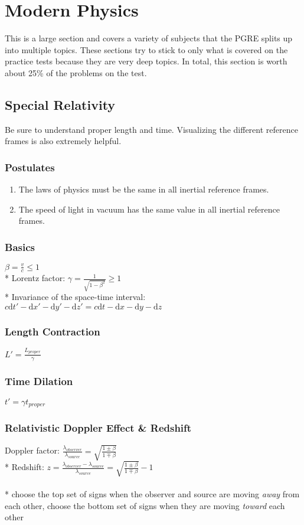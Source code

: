 \section{Modern Physics}
This is a large section and covers a variety of subjects that the PGRE splits up into multiple topics.
These sections try to stick to only what is covered on the practice tests because they are very deep topics.
In total, this section is worth about 25\% of the problems on the test.

\subsection{Special Relativity}
Be sure to understand proper length and time.
Visualizing the different reference frames is also extremely helpful.

\subsubsection{Postulates}
\begin{enumerate}
\item The laws of physics must be the same in all inertial reference frames.
\item The speed of light in vacuum has the same value in all inertial reference frames.
\end{enumerate}

\subsubsection{Basics}
\(\displaystyle\beta=\frac{v}{c}\le1\)\\*
Lorentz factor: \(\displaystyle\gamma=\frac{1}{\sqrt{1-\beta^2}}\ge1\)\\*
Invariance of the space-time interval: \(c\mathrm{d}t'-\mathrm{d}x'-\mathrm{d}y'-\mathrm{d}z'=c\mathrm{d}t-\mathrm{d}x-\mathrm{d}y-\mathrm{d}z\)

\subsubsection{Length Contraction}
\(\displaystyle L'=\frac{L_{proper}}{\gamma}\)

\subsubsection{Time Dilation}
\(t'=\gamma t_{proper}\)

\subsubsection{Relativistic Doppler Effect \& Redshift}
Doppler factor: \(\displaystyle \frac{\lambda_{observer}}{\lambda_{source}}=\sqrt{\frac{1\pm\beta}{1\mp\beta}}\)\\*
Redshift: \(\displaystyle z=\frac{\lambda_{observer}-\lambda_{source}}{\lambda_{source}}=\sqrt{\frac{1\pm\beta}{1\mp\beta}}-1\)\\\\*
choose the top set of signs when the observer and source are moving \emph{away} from each other, choose the bottom set of signs when they are moving \emph{toward} each other

